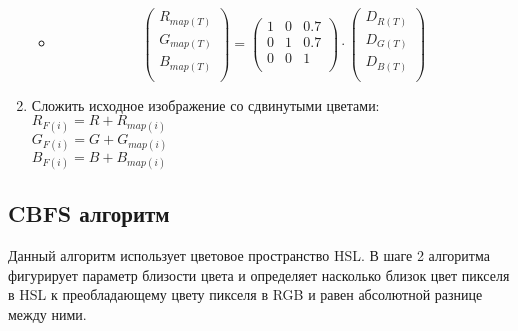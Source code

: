 \documentclass[a4paper,14pt, unknownkeysallowed]{extreport}
\begin{document}
\begin{enumerate}
\begin{itemize}
            \item 
            \begin{equation}
                \label{eq:color_blind_err_trit}
                \begin{pmatrix}
                    R_{map(T)} \\
                    G_{map(T)} \\
                    B_{map(T)} \\
                \end{pmatrix} = 
                \begin{pmatrix}
                    1 & 0 & 0.7 \\
                    0 & 1 & 0.7 \\
                    0 & 0 & 1   \\
                \end{pmatrix} \cdot
                \begin{pmatrix}
                    D_{R(T)} \\
                    D_{G(T)} \\
                    D_{B(T)} \\
                \end{pmatrix}
            \end{equation}
        \end{itemize}

        \item Сложить исходное изображение со сдвинутыми цветами: \\
        $R_{F(i)} = R + R_{map(i)}$ \\
        $G_{F(i)} = G + G_{map(i)}$ \\
        $B_{F(i)} = B + B_{map(i)}$
    \end{enumerate}

    \subsection{CBFS алгоритм}

    Данный алгоритм использует цветовое пространство HSL. В шаге 2 алгоритма фигурирует параметр близости цвета и определяет насколько близок цвет пикселя в HSL к преобладающему цвету пикселя в RGB и равен абсолютной разнице между ними.
\end{document}
